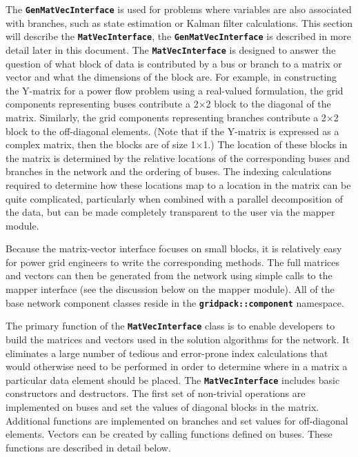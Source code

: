 The \texttt{\textbf{GenMatVecInterface}} is used for problems where variables
are also associated with branches, such as state estimation or Kalman filter
calculations. This section will describe the \texttt{\textbf{MatVecInterface}},
the \texttt{\textbf{GenMatVecInterface}} is described in more detail later in
this document. The \texttt{\textbf{MatVecInterface}} is designed to answer the
question of what block of data is contributed by a bus or branch to a matrix or
vector and what the dimensions of the block are. For example, in constructing
the Y-matrix for a power flow problem using a real-valued formulation, the grid
components representing buses contribute a 2$\mathrm{\times}$2 block to the
diagonal of the matrix. Similarly, the grid components representing branches
contribute a 2$\mathrm{\times}$2 block to the off-diagonal elements. (Note that
if the Y-matrix is expressed as a complex matrix, then the blocks are of size
1$\mathrm{\times}$1.) The location of these blocks in the matrix is determined
by the relative locations of the corresponding buses and branches in the network
and the ordering of buses. The indexing calculations required to determine how
these locations map to a location in the matrix can be quite complicated,
particularly when combined with a parallel decomposition of the data, but can be made completely transparent to the user via the mapper module. 

Because the matrix-vector interface focuses on small blocks, it is relatively easy for power grid engineers to write the corresponding methods. The full matrices and vectors can then be generated from the network using simple calls to the mapper interface (see the discussion below on the mapper module). All of the base network component classes reside in the \texttt{\textbf{gridpack::component}} namespace.

The primary function of the \texttt{\textbf{MatVecInterface}} class is to enable developers to build the matrices and vectors used in the solution algorithms for the network. It eliminates a large number of tedious and error-prone index calculations that would otherwise need to be performed in order to determine where in a matrix a particular data element should be placed. The \texttt{\textbf{MatVecInterface}} includes basic constructors and destructors. The first set of non-trivial operations are implemented on buses and set the values of diagonal blocks in the matrix. Additional functions are implemented on branches and set values for off-diagonal elements. Vectors can be created by calling functions defined on buses. These functions are described in detail below.

